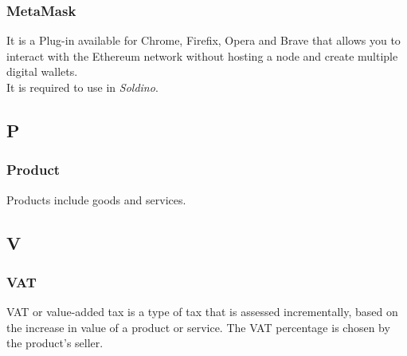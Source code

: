 		\subsubsection*{MetaMask}
		It is a Plug-in available for Chrome, Firefix, Opera and Brave that 
		allows you to interact with the Ethereum network without hosting a node 
		and create multiple digital wallets\glo.
		\\It is required to use in \textit{Soldino}.
		
	\subsection*{P}
		\subsubsection*{Product}
		Products include goods and services.
	\subsection*{V}
		\subsubsection*{VAT}
		VAT or value-added tax is a type of tax that is assessed incrementally, 
		based on the increase in value of a product or service. The VAT 
		percentage is chosen by the product's seller.